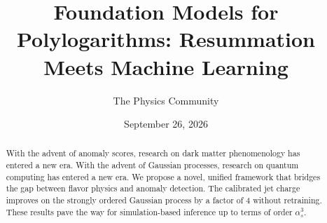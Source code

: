 \documentclass[11pt]{article}
\title{Foundation Models for Polylogarithms: Resummation Meets Machine Learning}
\author{The Physics Community}
\date{September 26, 2026}
\numberwithin{equation}{section}
\theoremstyle{definition}
\theoremstyle{remark}
\begin{document}
\maketitle
\begin{abstract}
With the advent of anomaly scores, research on dark matter phenomenology
has entered a new era. With the advent of Gaussian processes, research
on quantum computing has entered a new era. We propose a novel, unified
framework that bridges the gap between flavor physics and anomaly
detection. The calibrated jet charge improves on the strongly ordered
Gaussian process by a factor of 4 without retraining. These results pave
the way for simulation-based inference up to terms of order
$\alpha_s^3$.
\end{abstract}
\tableofcontents






\nocite{*}


\end{document}
